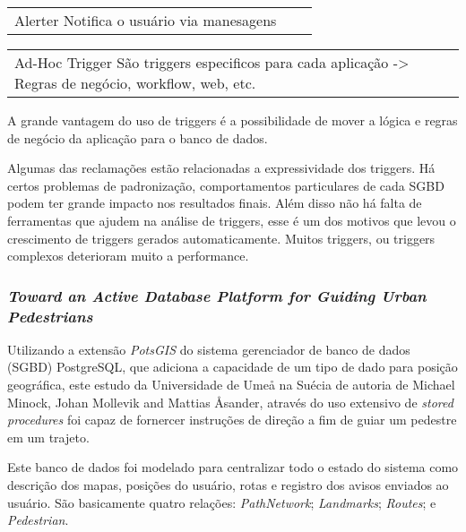 \documentclass[conference]{IEEEtran}
\begin{document}
\begin{table}[H]
\begin{tabular}{p{8cm}p{8cm}p{8cm}}
        \end{tabular}
        \begin{tabular}{p{8cm}p{8cm}p{8cm}}
            \vspace{0pt}
           Alerter
            \vspace{0pt}
           Notifica o usuário via manesagens
        \end{tabular}
        \begin{tabular}{p{8cm}p{8cm}p{8cm}}
            \vspace{0pt}
            Ad-Hoc Trigger
            \vspace{0pt}
            São triggers especificos para cada aplicação -> Regras de negócio, workflow, web, etc.
        \end{tabular}
    \end{table}

    A grande vantagem do uso de triggers é a possibilidade de mover a lógica e regras de negócio da aplicação para o banco de dados.

    Algumas das reclamações estão relacionadas a expressividade dos triggers. Há certos problemas de padronização, comportamentos particulares de cada SGBD podem ter grande impacto nos resultados finais. Além disso não há falta de ferramentas que ajudem na análise de triggers, esse é um dos motivos que levou o crescimento de triggers gerados automaticamente. Muitos triggers, ou triggers complexos deterioram muito a performance.

    \subsubsection{\textit{Toward an Active Database Platform for Guiding Urban Pedestrians}}
    Utilizando a extensão \textit{PotsGIS} do sistema gerenciador de banco de dados (SGBD) PostgreSQL, que adiciona a capacidade de um tipo de dado para posição geográfica, este estudo da Universidade de Ume\r{a} na Suécia de autoria de Michael Minock, Johan Mollevik and Mattias \r{A}sander, através do uso extensivo de \textit{stored procedures} foi capaz de fornercer instruções de direção a fim de guiar um pedestre em um trajeto.

    Este banco de dados foi modelado para centralizar todo o estado do sistema como descrição dos mapas, posições do usuário, rotas e registro dos avisos enviados ao usuário. São basicamente quatro relações: \textit{PathNetwork}; \textit{Landmarks}; \textit{Routes}; e \textit{Pedestrian}.
\end{document}
